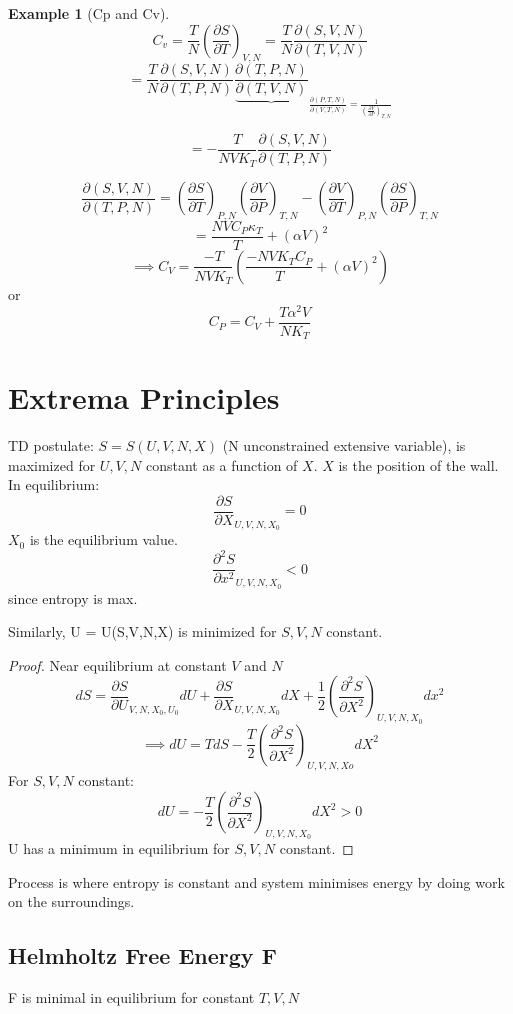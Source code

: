 \documentclass[11pt]{article}
\theoremstyle{definition}
\newtheorem{exm}{Example}[section]
\begin{document}
\begin{exm}[Cp and Cv]
	\[ C_v = \frac{T}{N} \left( \frac{\partial S}{\partial T} \right)_{V,N} = \frac{T}{N} \frac{\partial (S,V,N)}{\partial (T,V,N)}  \] 
	\[ = \frac{T}{N} \frac{\partial (S,V,N)}{\partial (T,P,N)} \frac{\partial (T,P,N)}{\underbrace{\partial (T,V,N)}}_{ \frac{\partial (P,T,N)}{\partial (V,T,N)}  = \frac{1}{\left( \frac{\partial V}{\partial P} \right)_{T,N} }} \] 

	\[ = -\frac{T}{NVK_T} \frac{\partial (S,V,N)}{\partial (T,P,N)}  \] 

	\[ \frac{\partial (S,V,N)}{\partial (T,P,N)} = \left( \frac{\partial S}{\partial T} \right)_{P,N} \left( \frac{\partial V}{\partial P} \right)_{T,N} - \left( \frac{\partial V}{\partial T} \right) _{P,N} \left( \frac{\partial S}{\partial P} \right)_{T,N}    \] 
	\[  = \frac{NVC_P\kappa_T}{T} + (\alpha V)^2 \] 
	\[ \implies C_V = \frac{-T}{NVK_T} \left( \frac{-NVK_T C_P}{T} + (\alpha V)^2 \right)  \] 
	or
	\[ C_P = C_V + \frac{T \alpha ^2V}{NK_T} \] 
	
\end{exm}

\section{Extrema Principles}
TD postulate: $ S =S(U,V,N,X) $ (N unconstrained extensive variable), is maximized for $ U,V,N $ constant as a function of $ X $. $ X $ is the position of the wall.
In equilibrium: 
\[ \frac{\partial S}{\partial X}_{U,V,N,X_0} = 0 \] $ X_0 $ is the equilibrium value.
\[ \frac{\partial ^2 S}{\partial x^2}_{U,V,N,X_0} < 0\] since entropy is max.

Similarly, U = U(S,V,N,X) is minimized for $ S,V,N $ constant.
\begin{proof}
	Near equilibrium at constant $ V $ and $ N $
	\[ dS = \frac{\partial S}{\partial U}_{V,N,X_0,U_0} dU + \frac{\partial S}{\partial X}_{U,V,N,X_0} dX  + \frac{1}{2} \left( \frac{\partial ^2S}{\partial X^2} \right)_{U,V,N,X_0} dx^2 \]
	\[ \implies dU  = TdS - \frac{T}{2} \left( \frac{\partial ^2S}{\partial X^2} \right)_{U,V,N,Xo} dX^2  \] 
	For $ S,V,N $  constant:
	\[ dU = - \frac{T}{2}  \left( \frac{\partial ^2S}{\partial X^2} \right)_{U,V,N,X_0} dX^2 > 0\] 
	U has a minimum in equilibrium for $ S,V,N $ constant.
\end{proof}
 Process is where entropy is constant and system minimises energy by doing work on the surroundings.

 \subsection{Helmholtz Free Energy F}
 F is minimal in equilibrium for constant $ T,V,N$ 
\end{document}
